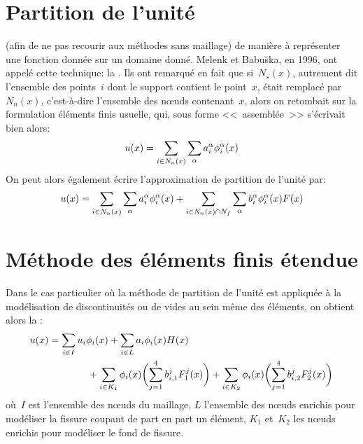 \section{Partition de l'unité}\label{Sec-partition}
 (afin de ne pas recourir aux méthodes sans maillage) de manière à représenter une fonction donnée sur un domaine donné.
Melenk et
Babu\u{s}ka,
en 1996, ont appelé cette technique:
la .
Ils ont remarqué en fait que si~$N_s(x)$, autrement dit l'ensemble des points~$i$ dont le support contient le point~$x$, était remplacé par~$N_n(x)$, c'est-à-dire l'ensemble des nœuds contenant~$x$, alors on retombait sur la formulation éléments finis usuelle, qui, sous forme <<~assemblée~>> s'écrivait bien alors:
\begin{equation}
u(x) = \displaystyle\sum_{i\in N_n(x)}\displaystyle\sum_{\alpha} a_i^\alpha \phi_i^\alpha(x)
\end{equation}
 On peut alors également écrire l'approximation de partition de l'unité par:
\begin{equation}
u(x) = \displaystyle\sum_{i\in N_n(x)}\displaystyle\sum_{\alpha} a_i^\alpha \phi_i^\alpha(x) + \displaystyle\sum_{i\in N_n(x)\cap N_f}\displaystyle\sum_{\alpha} b_i^\alpha\phi_i^\alpha(x)F(x)
\end{equation}



\medskip
\section{Méthode des éléments finis étendue}\label{Sec-XFEM}
Dans le cas particulier où la méthode de partition de l'unité est appliquée à la modélisation de discontinuités ou de vides au sein même des éléments, on obtient alors la :
\begin{equation}
\begin{aligned}
u(x) &= \displaystyle\sum_{i\in I}u_i\phi_i(x) + \displaystyle\sum_{i\in L} a_i\phi_i(x) H(x)\\
&\qquad\qquad + \displaystyle\sum_{i\in K_1}\phi_i(x)\biggl(\displaystyle\sum_{j=1}^4b_{i,1}^jF_1^j(x)\biggr) + \displaystyle\sum_{i\in K_2}\phi_i(x)\biggl(\displaystyle\sum_{j=1}^4b_{i,2}^jF_2^j(x)\biggr)
\end{aligned}
\end{equation}
où~$I$ est l'ensemble des nœuds du maillage, $L$ l'ensemble des nœuds enrichis pour modéliser la fissure coupant de part en part un élément, $K_1$ et~$K_2$ les nœuds enrichis pour modéliser le fond de fissure.

